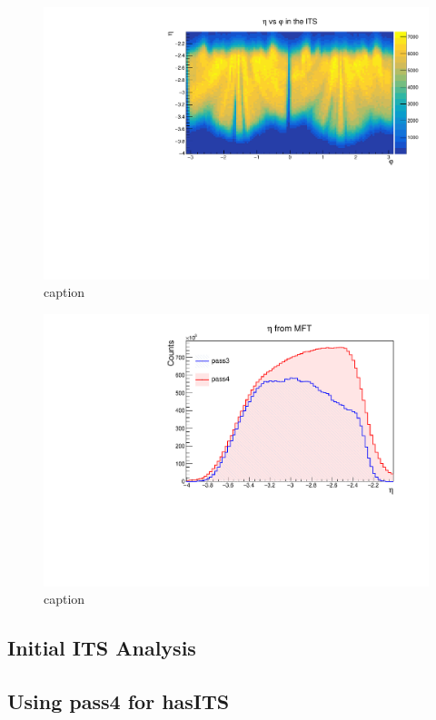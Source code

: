\begin{figure}[h]
    \begin{center}
        \includegraphics[width=.8\textwidth]{Plots/pass4_MFT/eta_phi_pass4.pdf}
        \caption{caption}
        \label{fig:eta_phi_pass4}
    \end{center}
\end{figure}


\begin{figure}[h]
    \begin{center}
        \includegraphics[width=.8\textwidth]{Plots/pass3_pass4.pdf}
        \caption{caption}
        \label{fig:pass3_pass4_eta}
    \end{center}
\end{figure}


\subsection{Initial ITS Analysis}


\subsection{Using pass4 for hasITS}